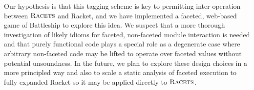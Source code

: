 \documentclass[review=true,acmlarge]{acmart}
\newcommand{\racets}[0]{$\textsc{Racets}$\xspace}
\begin{document}
Our hypothesis is that this tagging scheme is key to permitting inter-operation
between \racets and Racket, and we have implemented a faceted, web-based game of Battleship
to explore this idea. We suspect that a more thorough investigation of likely idioms
for faceted, non-faceted module interaction is needed and that purely functional code
plays a special role as a degenerate case where arbitrary non-faceted code may be lifted
to operate over faceted values without potential unsoundness. In the future, we plan to explore
these design choices in a more principled way and also to scale a static analysis of faceted
execution to fully expanded Racket so it may be applied directly to \racets.





\end{document}

